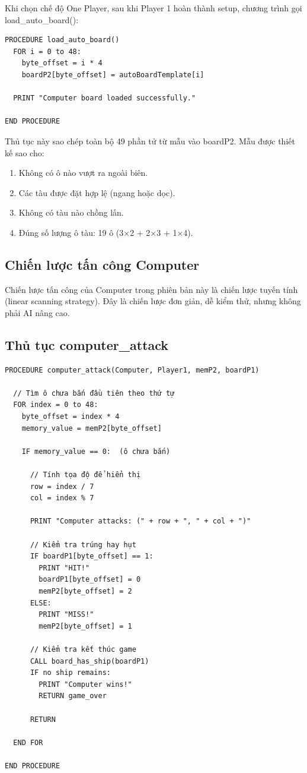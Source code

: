 Khi chọn chế độ One Player, sau khi Player 1 hoàn thành setup, chương trình gọi load\_auto\_board():

\begin{verbatim}
PROCEDURE load_auto_board()
  FOR i = 0 to 48:
    byte_offset = i * 4
    boardP2[byte_offset] = autoBoardTemplate[i]
  
  PRINT "Computer board loaded successfully."

END PROCEDURE
\end{verbatim}

Thủ tục này sao chép toàn bộ 49 phần tử từ mẫu vào boardP2. Mẫu được thiết kế sao cho:
\begin{enumerate}
    \item Không có ô nào vượt ra ngoài biên.
    \item Các tàu được đặt hợp lệ (ngang hoặc dọc).
    \item Không có tàu nào chồng lấn.
    \item Đúng số lượng ô tàu: 19 ô (3×2 + 2×3 + 1×4).
\end{enumerate}

\subsection{Chiến lược tấn công Computer}

Chiến lược tấn công của Computer trong phiên bản này là chiến lược tuyến tính (linear scanning strategy). Đây là chiến lược đơn giản, dễ kiểm thử, nhưng không phải AI nâng cao.

\subsection{Thủ tục computer\_attack}

\begin{verbatim}
PROCEDURE computer_attack(Computer, Player1, memP2, boardP1)
  
  // Tìm ô chưa bắn đầu tiên theo thứ tự
  FOR index = 0 to 48:
    byte_offset = index * 4
    memory_value = memP2[byte_offset]
    
    IF memory_value == 0:  (ô chưa bắn)
      
      // Tính tọa độ để hiển thị
      row = index / 7
      col = index % 7
      
      PRINT "Computer attacks: (" + row + ", " + col + ")"
      
      // Kiểm tra trúng hay hụt
      IF boardP1[byte_offset] == 1:
        PRINT "HIT!"
        boardP1[byte_offset] = 0
        memP2[byte_offset] = 2
      ELSE:
        PRINT "MISS!"
        memP2[byte_offset] = 1
      
      // Kiểm tra kết thúc game
      CALL board_has_ship(boardP1)
      IF no ship remains:
        PRINT "Computer wins!"
        RETURN game_over
      
      RETURN
  
  END FOR

END PROCEDURE
\end{verbatim}

